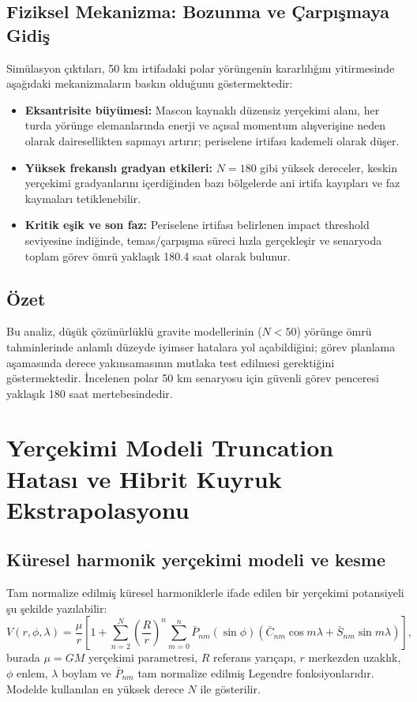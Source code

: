 \subsection{Fiziksel Mekanizma: Bozunma ve Çarpışmaya Gidiş}
Simülasyon çıktıları, 50 km irtifadaki polar yörüngenin kararlılığını yitirmesinde aşağıdaki mekanizmaların baskın olduğunu göstermektedir:
\begin{itemize}
    \item \textbf{Eksantrisite büyümesi:} Mascon kaynaklı düzensiz yerçekimi alanı, her turda yörünge elemanlarında enerji ve açısal momentum alışverişine neden olarak dairesellikten sapmayı artırır; periselene irtifası kademeli olarak düşer.
    \item \textbf{Yüksek frekanslı gradyan etkileri:} $N=180$ gibi yüksek dereceler, keskin yerçekimi gradyanlarını içerdiğinden bazı bölgelerde ani irtifa kayıpları ve faz kaymaları tetiklenebilir.
    \item \textbf{Kritik eşik ve son faz:} Periselene irtifası belirlenen impact threshold seviyesine indiğinde, temas/çarpışma süreci hızla gerçekleşir ve senaryoda toplam görev ömrü yaklaşık 180.4 saat olarak bulunur.
\end{itemize}

\subsection{Özet}
Bu analiz, düşük çözünürlüklü gravite modellerinin ($N<50$) yörünge ömrü tahminlerinde anlamlı düzeyde iyimser hatalara yol açabildiğini; görev planlama aşamasında derece yakınsamasının mutlaka test edilmesi gerektiğini göstermektedir. İncelenen polar 50 km senaryosu için güvenli görev penceresi yaklaşık 180 saat mertebesindedir.



\section{Yerçekimi Modeli Truncation Hatası ve Hibrit Kuyruk Ekstrapolasyonu}

\subsection{Küresel harmonik yerçekimi modeli ve kesme}
Tam normalize edilmiş küresel harmoniklerle ifade edilen bir yerçekimi potansiyeli şu şekilde yazılabilir:
\begin{equation}
V(r,\phi,\lambda)
=
\frac{\mu}{r}
\left[
1
+
\sum_{n=2}^{N}
\left(\frac{R}{r}\right)^{n}
\sum_{m=0}^{n}
\bar{P}_{nm}(\sin\phi)
\left(
\bar{C}_{nm}\cos m\lambda
+
\bar{S}_{nm}\sin m\lambda
\right)
\right],
\label{eq:V_sh}
\end{equation}
burada $\mu=GM$ yerçekimi parametresi, $R$ referans yarıçapı, $r$ merkezden uzaklık, $\phi$ enlem, $\lambda$ boylam ve $\bar{P}_{nm}$ tam normalize edilmiş Legendre fonksiyonlarıdır. Modelde kullanılan en yüksek derece $N$ ile gösterilir.

